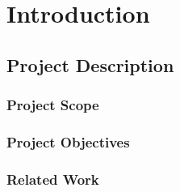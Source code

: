 \chapter{Introduction}
\label{chapter:intro}

\section{Project Description}
\label{sec:intro-section1}

\subsection{Project Scope}
\label{sub-sec:intro-subsection1}

\subsection{Project Objectives}
\label{sub-sec:intro-subsection2}

\subsection{Related Work}
\label{sub-sec:intro-subsection3}

